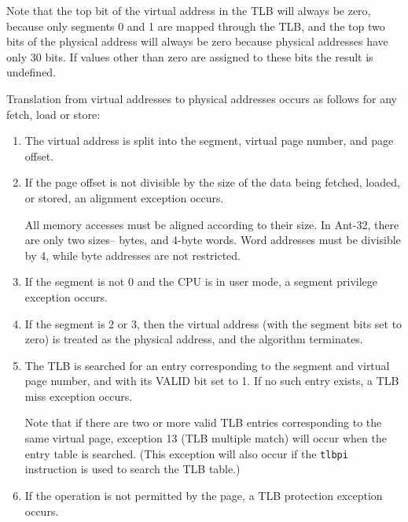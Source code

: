 Note that the top bit of the virtual address in the TLB will always be
zero, because only segments 0 and 1 are mapped through the TLB, and
the top two bits of the physical address will always be zero because
physical addresses have only 30 bits.  If values other than zero are
assigned to these bits the result is undefined.

Translation from virtual addresses to physical addresses occurs as follows 
for any fetch, load or store:

\begin{enumerate}

        \item The virtual address is split into the segment, virtual
                page number, and page offset.

        \item If the page offset is not divisible by the size of the
                data being fetched, loaded, or stored, an alignment
                exception occurs.

                All memory accesses must be aligned according to their
                size.  In Ant-32, there are only two sizes-- bytes, and
                4-byte words.  Word addresses must be divisible by 4,
                while byte addresses are not restricted.

        \item If the segment is not 0 and the CPU is in user mode, a
                segment privilege exception occurs.

        \item If the segment is 2 or 3, then the virtual address (with
                the segment bits set to zero) is treated as the
                physical address, and the algorithm terminates.

        \item The TLB is searched for an entry corresponding to the
                segment and virtual page number, and with its {\sc
                VALID} bit set to 1.  If no such entry exists, a TLB
                miss exception occurs.

                Note that if there are two or more valid TLB entries
                corresponding to the same virtual page, exception 13
                (TLB multiple match) will occur when the entry table
                is searched.  (This exception will also occur if the
                {\tt tlbpi} instruction is used to search the TLB
                table.)

        \item If the operation is not permitted by the page, a
                TLB protection exception occurs.


\end{enumerate}
